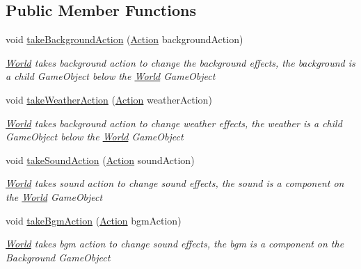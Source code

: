 \subsection*{Public Member Functions}
\begin{DoxyCompactItemize}
\item 
void \hyperlink{classdoki_unity_1_1_world_aa308177fc8a31254b81e9def60f96576}{take\+Background\+Action} (\hyperlink{classdoki_script_setting_1_1_action}{Action} background\+Action)
\begin{DoxyCompactList}\small\item\em \hyperlink{classdoki_unity_1_1_world}{World} takes background action to change the background effects, the background is a child Game\+Object below the \hyperlink{classdoki_unity_1_1_world}{World} Game\+Object \end{DoxyCompactList}\item 
void \hyperlink{classdoki_unity_1_1_world_a509e9d853ec760a3c3db1b3490597139}{take\+Weather\+Action} (\hyperlink{classdoki_script_setting_1_1_action}{Action} weather\+Action)
\begin{DoxyCompactList}\small\item\em \hyperlink{classdoki_unity_1_1_world}{World} takes background action to change weather effects, the weather is a child Game\+Object below the \hyperlink{classdoki_unity_1_1_world}{World} Game\+Object \end{DoxyCompactList}\item 
void \hyperlink{classdoki_unity_1_1_world_a06b7c1fe9e33bf8a5ad8f6cfd74c935c}{take\+Sound\+Action} (\hyperlink{classdoki_script_setting_1_1_action}{Action} sound\+Action)
\begin{DoxyCompactList}\small\item\em \hyperlink{classdoki_unity_1_1_world}{World} takes sound action to change sound effects, the sound is a component on the \hyperlink{classdoki_unity_1_1_world}{World} Game\+Object \end{DoxyCompactList}\item 
void \hyperlink{classdoki_unity_1_1_world_a3d77da3ca00cf1c70d57fc8c8be4a6a5}{take\+Bgm\+Action} (\hyperlink{classdoki_script_setting_1_1_action}{Action} bgm\+Action)
\begin{DoxyCompactList}\small\item\em \hyperlink{classdoki_unity_1_1_world}{World} takes bgm action to change sound effects, the bgm is a component on the Background Game\+Object \end{DoxyCompactList}\item 

\end{DoxyCompactItemize}
